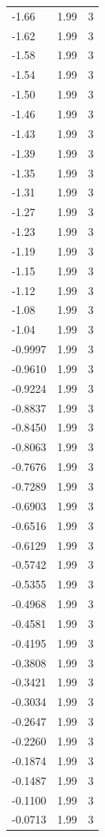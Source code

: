 \begin{longtable}{lrr}
  -1.66 & 1.99 & 3 \\
  -1.62 & 1.99 & 3 \\
  -1.58 & 1.99 & 3 \\
  -1.54 & 1.99 & 3 \\
  -1.50 & 1.99 & 3 \\
  -1.46 & 1.99 & 3 \\
  -1.43 & 1.99 & 3 \\
  -1.39 & 1.99 & 3 \\
  -1.35 & 1.99 & 3 \\
  -1.31 & 1.99 & 3 \\
  -1.27 & 1.99 & 3 \\
  -1.23 & 1.99 & 3 \\
  -1.19 & 1.99 & 3 \\
  -1.15 & 1.99 & 3 \\
  -1.12 & 1.99 & 3 \\
  -1.08 & 1.99 & 3 \\
  -1.04 & 1.99 & 3 \\
  -0.9997 & 1.99 & 3 \\
  -0.9610 & 1.99 & 3 \\
  -0.9224 & 1.99 & 3 \\
  -0.8837 & 1.99 & 3 \\
  -0.8450 & 1.99 & 3 \\
  -0.8063 & 1.99 & 3 \\
  -0.7676 & 1.99 & 3 \\
  -0.7289 & 1.99 & 3 \\
  -0.6903 & 1.99 & 3 \\
  -0.6516 & 1.99 & 3 \\
  -0.6129 & 1.99 & 3 \\
  -0.5742 & 1.99 & 3 \\
  -0.5355 & 1.99 & 3 \\
  -0.4968 & 1.99 & 3 \\
  -0.4581 & 1.99 & 3 \\
  -0.4195 & 1.99 & 3 \\
  -0.3808 & 1.99 & 3 \\
  -0.3421 & 1.99 & 3 \\
  -0.3034 & 1.99 & 3 \\
  -0.2647 & 1.99 & 3 \\
  -0.2260 & 1.99 & 3 \\
  -0.1874 & 1.99 & 3 \\
  -0.1487 & 1.99 & 3 \\
  -0.1100 & 1.99 & 3 \\
  -0.0713 & 1.99 & 3 \\

\end{longtable}
